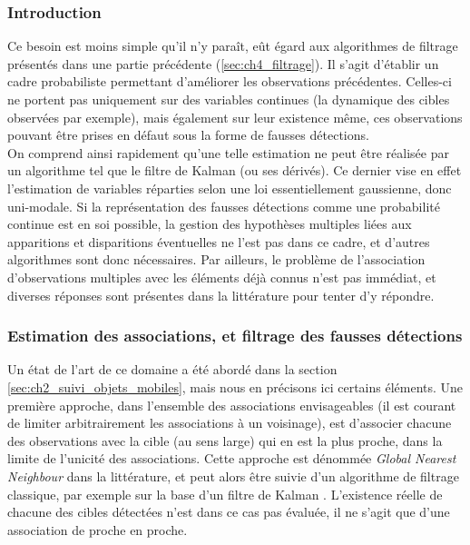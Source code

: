 \subsubsection{Introduction}
Ce besoin est moins simple qu'il n'y paraît, eût égard aux algorithmes de filtrage présentés dans une partie précédente (\ref{sec:ch4_filtrage}). Il s'agit d'établir un cadre probabiliste permettant d'améliorer les observations précédentes. Celles-ci ne portent pas uniquement sur des variables continues (la dynamique des cibles observées par exemple), mais également sur leur existence même, ces observations pouvant être prises en défaut sous la forme de fausses détections.\\
On comprend ainsi rapidement qu'une telle estimation ne peut être réalisée par un algorithme tel que le filtre de Kalman (ou ses dérivés). Ce dernier vise en effet l'estimation de variables réparties selon une loi essentiellement gaussienne, donc uni-modale. Si la représentation des fausses détections comme une probabilité continue est en soi possible, la gestion des hypothèses multiples liées aux apparitions et disparitions éventuelles ne l'est pas dans ce cadre, et d'autres algorithmes sont donc nécessaires. Par ailleurs, le problème de l'association d'observations multiples avec les éléments déjà connus n'est pas immédiat, et diverses réponses sont présentes dans la littérature pour tenter d'y répondre.

\subsubsection{Estimation des associations, et filtrage des fausses détections}
Un état de l'art de ce domaine a été abordé dans la section \ref{sec:ch2_suivi_objets_mobiles}, mais nous en précisons ici certains éléments. Une première approche, dans l'ensemble des associations envisageables (il est courant de limiter arbitrairement les associations à un voisinage), est d'associer chacune des observations avec la cible (au sens large) qui en est la plus proche, dans la limite de l'unicité des associations. Cette approche est dénommée \emph{Global Nearest Neighbour} dans la littérature, et peut alors être suivie d'un algorithme de filtrage \og classique\fg{}, par exemple sur la base d'un filtre de Kalman \cite{Blackman2004}. L'existence réelle de chacune des cibles détectées n'est dans ce cas pas évaluée, il ne s'agit que d'une association de proche en proche.\\

